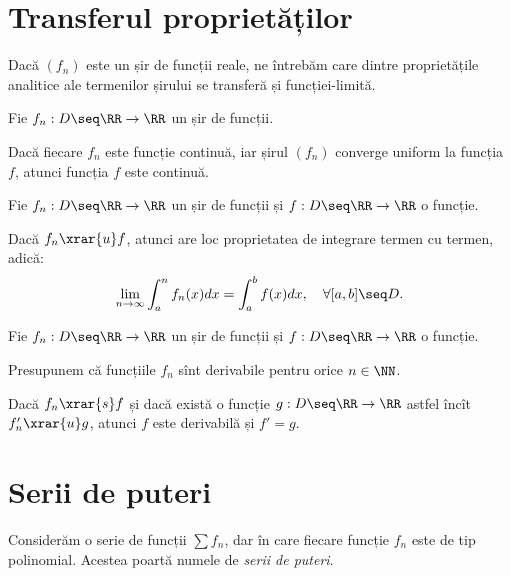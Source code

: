\section{Transferul proprietăților}

Dacă $ (f_n) $ este un șir de funcții reale, ne întrebăm care dintre proprietățile
analitice ale termenilor șirului se transferă și funcției-limită.

\begin{theorem}\label{thm:transfer-cont}
    Fie $ f_n : D \seq \RR \to \RR $ un șir de funcții.

    Dacă fiecare $ f_n $ este funcție continuă, iar șirul $ (f_n) $ converge
    uniform la funcția $ f $, atunci funcția $ f $ este continuă.
\end{theorem}

\begin{theorem}\label{thm:transfer-int}
    Fie $ f_n : D \seq \RR \to \RR $ un șir de funcții și $ f : D \seq \RR \to \RR $
    o funcție.

    Dacă $ f_n \xrar{u} f $, atunci are loc proprietatea de integrare termen cu
    termen, adică:
    \[
        \lim_{n \to \infty} \int_a^n f_n(x) dx = \int_a^b f(x) dx, \quad \forall [a, b] \seq D.
    \]
\end{theorem}

\begin{theorem}\label{thm:transfer-der}
    Fie $ f_n : D \seq \RR \to \RR $ un șir de funcții și $ f : D \seq \RR \to \RR $
    o funcție.

    Presupunem că funcțiile $ f_n $ sînt derivabile pentru orice $ n \in \NN $.

    Dacă $ f_n \xrar{s} f $ și dacă există o funcție $ g : D \seq \RR \to \RR $
    astfel încît $ f'_n \xrar{u} g $, atunci $ f $ este derivabilă și $ f' = g $.
\end{theorem}


\section{Serii de puteri}

Considerăm o serie de funcții $ \sum f_n $, dar în care fiecare funcție $ f_n $
este de tip polinomial. Acestea poartă numele de \emph{serii de puteri}.

